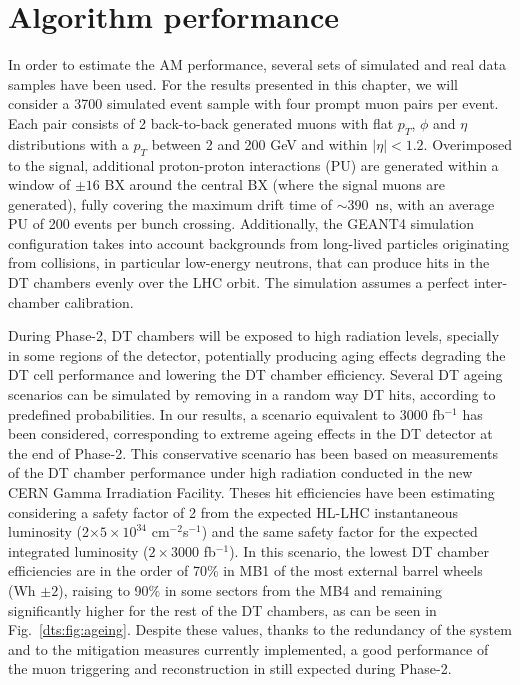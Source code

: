 \documentclass[../main.tex]{subfiles}
\begin{document}
\section{Algorithm performance}
\label{dts:sec:performance}

In order to estimate the AM performance, several sets of simulated and real data samples have been used. For the results presented in this chapter, we will consider a 3700 simulated event sample with four prompt muon pairs per event. Each pair consists of 2 back-to-back generated muons with flat $p_T$, $\phi$  and $\eta$ distributions with a $p_T$ between 2 and 200 GeV and within $|\eta|<1.2$. Overimposed to the signal, additional proton-proton interactions (PU) are generated within a window of $\pm16$ BX around the central BX (where the signal muons are generated), fully covering the maximum drift time of $\sim$390~ns, with an average PU of 200 events per bunch crossing. Additionally, the GEANT4 \cite{geant} simulation configuration takes into account backgrounds from long-lived particles originating from collisions, in particular low-energy neutrons, that can produce hits in the DT chambers evenly over the LHC orbit. The simulation assumes a perfect inter-chamber calibration.

During Phase-2, DT chambers will be exposed to high radiation levels, specially in some regions of the detector, potentially producing aging effects degrading the DT cell performance and lowering the DT chamber efficiency. Several DT ageing scenarios can be simulated by removing in a random way DT hits, according to predefined probabilities. In our results, a scenario equivalent to 3000 fb${}^{-1}$ has been considered, corresponding to extreme ageing effects in the DT detector at the end of Phase-2. This conservative scenario has been based on measurements of the DT chamber performance under high radiation conducted in the new CERN Gamma Irradiation Facility. Theses hit efficiencies have been estimating considering a safety factor of 2 from the expected HL-LHC instantaneous luminosity (2$\times 5\times 10^{34}$ cm${}^{-2}$s${}^{-1}$) and the same safety factor for the expected integrated luminosity ($2\times$3000 fb${}^{-1}$). In this scenario, the lowest DT chamber efficiencies are in the order of 70$\%$ in MB1 of the most external barrel wheels (Wh $\pm2$), raising to 90$\%$ in some sectors from the MB4 and remaining significantly higher for the rest of the DT chambers, as can be seen in Fig.~\ref{dts:fig:ageing}. Despite these values, thanks to the redundancy of the system and to the mitigation measures currently implemented, a good performance of the muon triggering and reconstruction in still expected during Phase-2.
\end{document}
